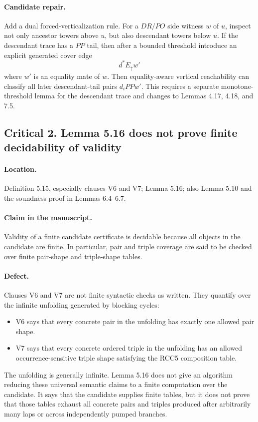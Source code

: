 \documentclass[11pt]{article}
\begin{document}
\paragraph{Candidate repair.} Add a dual forced-verticalization rule. For a $DR/PO$ side witness $w$ of $u$, inspect not only ancestor towers above $u$, but also descendant towers below $u$. If the descendant trace has a $PP$ tail, then after a bounded threshold introduce an explicit generated cover edge
\[
  d^{\ast}E_{\uparrow}w'
\]
where $w'$ is an equality mate of $w$. Then equality-aware vertical reachability can classify all later descendant-tail pairs $d_iPPw'$. This requires a separate monotone-threshold lemma for the descendant trace and changes to Lemmas 4.17, 4.18, and 7.5.

\subsection*{Critical 2. Lemma 5.16 does not prove finite decidability of validity}

\paragraph{Location.} Definition 5.15, especially clauses V6 and V7; Lemma 5.16; also Lemma 5.10 and the soundness proof in Lemmas 6.4--6.7.

\paragraph{Claim in the manuscript.} Validity of a finite candidate certificate is decidable because all objects in the candidate are finite. In particular, pair and triple coverage are said to be checked over finite pair-shape and triple-shape tables.

\paragraph{Defect.} Clauses V6 and V7 are not finite syntactic checks as written. They quantify over the infinite unfolding generated by blocking cycles:
\begin{itemize}
  \item V6 says that every concrete pair in the unfolding has exactly one allowed pair shape.
  \item V7 says that every concrete ordered triple in the unfolding has an allowed occurrence-sensitive triple shape satisfying the RCC5 composition table.
\end{itemize}
The unfolding is generally infinite. Lemma 5.16 does not give an algorithm reducing these universal semantic claims to a finite computation over the candidate. It says that the candidate supplies finite tables, but it does not prove that those tables exhaust all concrete pairs and triples produced after arbitrarily many laps or across independently pumped branches.
\end{document}

